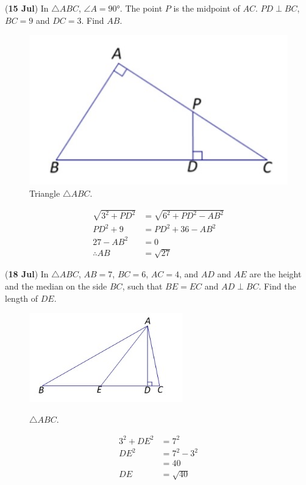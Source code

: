 \documentclass[12pt,answers]{exam}
\newcommand{\qndate}[2]{(\textbf{#1 #2})}
\begin{document}
\begin{questions}
	\question \qndate{15}{Jul} In $\triangle ABC$, $\angle A = \ang{90}$. The point
	$P$ is the midpoint of $AC$. $PD \perp BC$, $BC = 9$ and $DC = 3$.
	Find $AB$.
	\begin{figure}[htpb]
		\centering
		\includegraphics[scale=.5]{images/0715_Tri.jpeg}
		\caption{Triangle $\triangle ABC$.}
		\label{fig:0715_Tri}
	\end{figure}
	\begin{solution}
		\begin{align*}
			\sqrt{3^2 + {PD}^2} & = \sqrt{6^2 + {PD}^2 - {AB}^2} \\
			{PD}^2 + 9          & = {PD}^2 + 36 - {AB}^2         \\
			27 - {AB}^2         & = 0                            \\
			\therefore AB       & = \sqrt{27}
		\end{align*}
	\end{solution}

	\question \qndate{18}{Jul} In $\triangle ABC$, $AB=7$, $BC=6$, $AC=4$, and
	$AD$ and $AE$ are the height and the median on the side $BC$, such that $BE=EC$
	and $AD\perp BC$. Find the length of $DE$.
	\begin{figure}[htpb]
		\centering
		\includegraphics[scale=.7]{images/0718_Tri.jpeg}
		\label{fig:0718_Tri}
		\caption{$\triangle ABC$.}
	\end{figure}
	\begin{solution}
		\begin{align*}
			3^2 + {DE}^2 & = 7^2       \\
			{DE}^2       & = 7^2 - 3^2 \\
			             & = 40        \\
			{DE}         & = \sqrt{40}
		\end{align*}
	\end{solution}


\end{questions}
\end{document}
